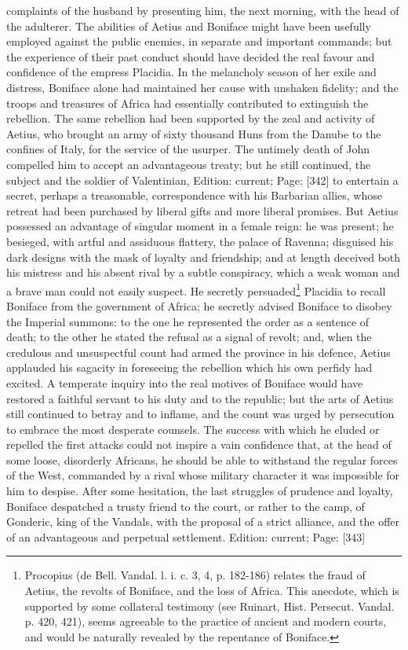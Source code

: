 complaints of the husband by presenting him, the next morning, with the head of the adulterer. The abilities of Aetius and Boniface might have been usefully employed against the public enemies, in separate and important commands; but the experience of their past conduct should have decided the real favour and confidence of the empress Placidia. In the melancholy season of her exile and distress, Boniface alone had maintained her cause with unshaken fidelity; and the troops and treasures of Africa had essentially contributed to extinguish the rebellion. The same rebellion had been supported by the zeal and activity of Aetius, who brought an army of sixty thousand Huns from the Danube to the confines of Italy, for the service of the usurper. The untimely death of John compelled him to accept an advantageous treaty; but he still continued, the subject and the soldier of Valentinian, Edition: current; Page: [342] to entertain a secret, perhaps a treasonable, correspondence with his Barbarian allies, whose retreat had been purchased by liberal gifts and more liberal promises. But Aetius possessed an advantage of singular moment in a female reign: he was present; he besieged, with artful and assiduous flattery, the palace of Ravenna; disguised his dark designs with the mask of loyalty and friendship; and at length deceived both his mistress and his absent rival by a subtle conspiracy, which a weak woman and a brave man could not easily suspect. He secretly persuaded\footnote{Procopius (de Bell. Vandal. l. i. c. 3, 4, p. 182-186) relates the fraud of Aetius, the revolts of Boniface, and the loss of Africa. This anecdote, which is supported by some collateral testimony (see Ruinart, Hist. Persecut. Vandal. p. 420, 421), seems agreeable to the practice of ancient and modern courts, and would be naturally revealed by the repentance of Boniface.} Placidia to recall Boniface from the government of Africa; he secretly advised Boniface to disobey the Imperial summons: to the one he represented the order as a sentence of death; to the other he stated the refusal as a signal of revolt; and, when the credulous and unsuspectful count had armed the province in his defence, Aetius applauded his sagacity in foreseeing the rebellion which his own perfidy had excited. A temperate inquiry into the real motives of Boniface would have restored a faithful servant to his duty and to the republic; but the arts of Aetius still continued to betray and to inflame, and the count was urged by persecution to embrace the most desperate counsels. The success with which he eluded or repelled the first attacks could not inspire a vain confidence that, at the head of some loose, disorderly Africans, he should be able to withstand the regular forces of the West, commanded by a rival whose military character it was impossible for him to despise. After some hesitation, the last struggles of prudence and loyalty, Boniface despatched a trusty friend to the court, or rather to the camp, of Gonderic, king of the Vandals, with the proposal of a strict alliance, and the offer of an advantageous and perpetual settlement.
Edition: current; Page: [343]

